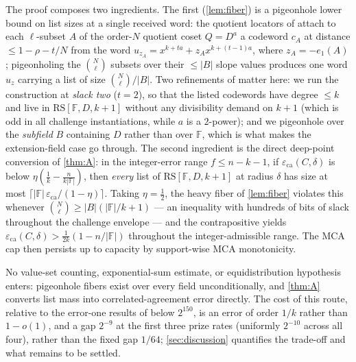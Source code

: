 \documentclass[11pt]{article}
\theoremstyle{definition}
\theoremstyle{remark}
\newcommand{\F}{\mathbb{F}}
\newcommand{\B}{B}
\newcommand{\RS}{\mathrm{RS}}
\newcommand{\eca}{\varepsilon_{\mathrm{ca}}}
\newcommand{\eone}{e_1}
\begin{document}
The proof composes two ingredients. The first (\cref{lem:fiber}) is a pigeonhole lower bound on list sizes at a single received word: the quotient locators of \cite{Cho26a} attach to each $\ell$-subset $A$ of the order-$N$ quotient coset $Q=D^{a}$ a codeword $c_A$ at distance $\le1-\rho-t/N$ from the word $u_{z_A}=x^{k+ta}+z_Ax^{k+(t-1)a}$, where $z_A=-\eone(A)$; pigeonholing the $\binom N\ell$ subsets over their $\le|\B|$ slope values produces one word $u_z$ carrying a list of size $\binom N\ell/|\B|$. Two refinements of \cite[Main Thm.\,(d)]{Cho26a} matter here: we run the construction at \emph{slack two} ($t=2$), so that the listed codewords have degree $\le k$ and live in $\RS[\F,D,k+1]$ without any divisibility demand on $k+1$ (which is odd in all challenge instantiations, while $a$ is a $2$-power); and we pigeonhole over the \emph{subfield} $\B$ containing $D$ rather than over $\F$, which is what makes the extension-field case go through. The second ingredient is the direct deep-point conversion of \cref{thm:A}: in the integer-error range $f\le n-k-1$, if $\eca(C,\delta)$ is below $\eta(\frac1k-\frac n{k|\F|})$, then \emph{every} list of $\RS[\F,D,k+1]$ at radius $\delta$ has size at most $\lceil|\F|\,\eca/(1-\eta)\rceil$. Taking $\eta=\frac12$, the heavy fiber of \cref{lem:fiber} violates this whenever $\binom N\ell\ge|\B|(|\F|/k+1)$ --- an inequality with hundreds of bits of slack throughout the challenge envelope --- and the contrapositive yields $\eca(C,\delta)>\frac1{2k}(1-n/|\F|)$ throughout the integer-admissible range. The MCA cap then persists up to capacity by support-wise MCA monotonicity.

No value-set counting, exponential-sum estimate, or equidistribution hypothesis enters: pigeonhole fibers exist over every field unconditionally, and \cref{thm:A} converts list mass into correlated-agreement error directly. The cost of this route, relative to the error-one results of \cite{Cho26a,Cho26b} below $2^{150}$, is an error of order $1/k$ rather than $1-o(1)$, and a gap $2^{-9}$ at the first three prize rates (uniformly $2^{-10}$ across all four), rather than the fixed gap $1/64$; \cref{sec:discussion} quantifies the trade-off and what remains to be settled.
\end{document}
